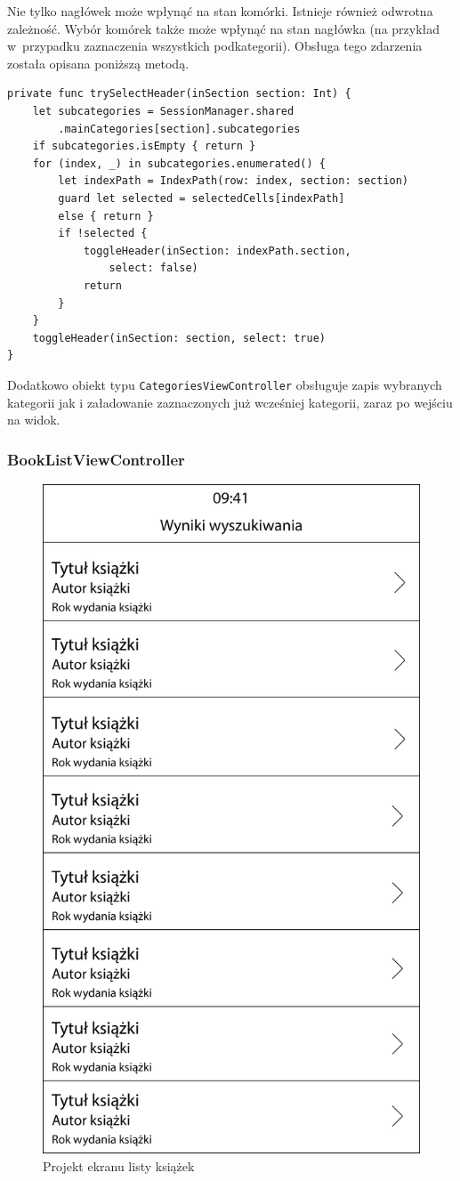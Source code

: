 \documentclass[twoside]{projektInzynierskiMS}
\begin{document}
Nie tylko nagłówek może wpłynąć na stan komórki. Istnieje również odwrotna zależność. Wybór komórek także może wpłynąć na stan nagłówka (na przykład w~przypadku zaznaczenia wszystkich podkategorii). Obsługa tego zdarzenia została opisana poniższą metodą.
\begin{verbatim}
private func trySelectHeader(inSection section: Int) {
    let subcategories = SessionManager.shared
        .mainCategories[section].subcategories
    if subcategories.isEmpty { return }
    for (index, _) in subcategories.enumerated() {
        let indexPath = IndexPath(row: index, section: section)
        guard let selected = selectedCells[indexPath]
        else { return }
        if !selected {
            toggleHeader(inSection: indexPath.section,
                select: false)
            return
        }
    }
    toggleHeader(inSection: section, select: true)
}
\end{verbatim}

Dodatkowo obiekt typu \verb`CategoriesViewController` obsługuje zapis wybranych kategorii jak i załadowanie zaznaczonych już wcześniej kategorii, zaraz po wejściu na widok. 


\subsubsection{BookListViewController}

\begin{figure}[h]
  \centering
  \includegraphics[width=0.4\linewidth]{img/BookListProject.png}
  \caption{Projekt ekranu listy książek}
  \label{fig:iosCategories}
\end{figure}
\end{document}

